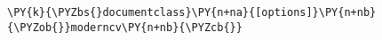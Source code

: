 \begin{Verbatim}[commandchars=\\\{\}]
\PY{k}{\PYZbs{}documentclass}\PY{n+na}{[options]}\PY{n+nb}{\PYZob{}}moderncv\PY{n+nb}{\PYZcb{}}
\end{Verbatim}
